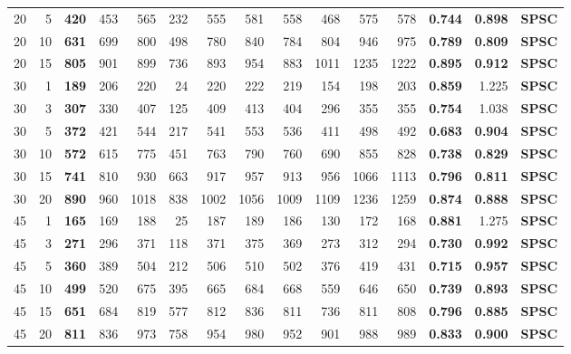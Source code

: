 \documentclass{article}
\begin{document}
\begin{table}[!htbp]
\begin{tabular}{rr|rrrrrrrrrr|rrl}
   20 &  5 &  \textbf{420} &  453 &  565 &  232 &  555 &  581 &  558 &  468 &  575 &  578 & \textbf{0.744} & \textbf{0.898} & \textbf{SPSC}
  \\
   20 & 10 &  \textbf{631} &  699 &  800 &  498 &  780 &  840 &  784 &  804 &  946 &  975 & \textbf{0.789} & \textbf{0.809} & \textbf{SPSC}
  \\
   20 & 15 &  \textbf{805} &  901 &  899 &  736 &  893 &  954 &  883 & 1011 & 1235 & 1222 & \textbf{0.895} & \textbf{0.912} & \textbf{SPSC}
  \\
   30 &  1 &  \textbf{189} &  206 &  220 &   24 &  220 &  222 &  219 &  154 &  198 &  203 & \textbf{0.859} & 1.225 & \textbf{SPSC} \\
   30 &  3 &  \textbf{307} &  330 &  407 &  125 &  409 &  413 &  404 &  296 &  355 &  355 & \textbf{0.754} & 1.038 & \textbf{SPSC} \\
   30 &  5 &  \textbf{372} &  421 &  544 &  217 &  541 &  553 &  536 &  411 &  498 &  492 & \textbf{0.683} & \textbf{0.904} & \textbf{SPSC}
  \\
   30 & 10 &  \textbf{572} &  615 &  775 &  451 &  763 &  790 &  760 &  690 &  855 &  828 & \textbf{0.738} & \textbf{0.829} & \textbf{SPSC}
  \\
   30 & 15 &  \textbf{741} &  810 &  930 &  663 &  917 &  957 &  913 &  956 & 1066 & 1113 & \textbf{0.796} & \textbf{0.811} & \textbf{SPSC}
  \\
   30 & 20 &  \textbf{890} &  960 & 1018 &  838 & 1002 & 1056 & 1009 & 1109 & 1236 & 1259 & \textbf{0.874} & \textbf{0.888} & \textbf{SPSC}
  \\
   45 &  1 &  \textbf{165} &  169 &  188 &   25 &  187 &  189 &  186 &  130 &  172 &  168 & \textbf{0.881} & 1.275 & \textbf{SPSC} \\
   45 &  3 &  \textbf{271} &  296 &  371 &  118 &  371 &  375 &  369 &  273 &  312 &  294 & \textbf{0.730} & \textbf{0.992} & \textbf{SPSC}
  \\
   45 &  5 &  \textbf{360} &  389 &  504 &  212 &  506 &  510 &  502 &  376 &  419 &  431 & \textbf{0.715} & \textbf{0.957} & \textbf{SPSC}
  \\
   45 & 10 &  \textbf{499} &  520 &  675 &  395 &  665 &  684 &  668 &  559 &  646 &  650 & \textbf{0.739} & \textbf{0.893} & \textbf{SPSC}
  \\
   45 & 15 &  \textbf{651} &  684 &  819 &  577 &  812 &  836 &  811 &  736 &  811 &  808 & \textbf{0.796} & \textbf{0.885} & \textbf{SPSC}
  \\
   45 & 20 &  \textbf{811} &  836 &  973 &  758 &  954 &  980 &  952 &  901 &  988 &  989 & \textbf{0.833} & \textbf{0.900} & \textbf{SPSC}

\end{tabular}
\end{table}
\end{document}
